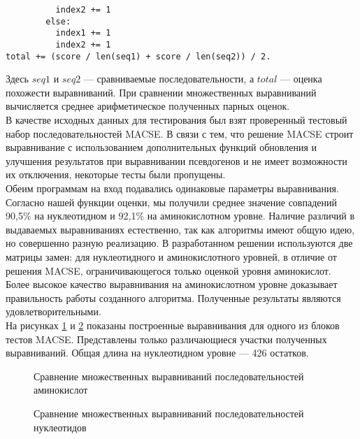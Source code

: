 \begin{algorithm}
	\begin{lstlisting}
          index2 += 1      
        else:
          index1 += 1
          index2 += 1
total += (score / len(seq1) + score / len(seq2)) / 2.
	\end{lstlisting}
\end{algorithm}
Здесь $seq1$ и $seq2$ --- сравниваемые последовательности, а $total$ --- оценка похожести выравниваний. При сравнении множественных выравниваний вычисляется среднее арифметическое полученных парных оценок.\\
\indent В качестве исходных данных для тестирования был взят проверенный тестовый набор последовательностей MACSE. В связи с тем, что решение MACSE строит выравнивание с использованием дополнительных функций обновления и улучшения результатов при выравнивании псевдогенов и не имеет возможности их отключения, некоторые тесты были пропущены. \\
\indent Обеим программам на вход подавались одинаковые параметры выравнивания. Согласно нашей функции оценки, мы получили среднее значение совпадений 90,5\% на нуклеотидном и 92,1\% на аминокислотном уровне. Наличие различий в выдаваемых выравниваниях естественно, так как алгоритмы имеют общую идею, но совершенно разную реализацию. В разработанном решении используются две матрицы замен: для нуклеотидного и аминокислотного уровней, в отличие от решения MACSE, ограничивающегося только оценкой уровня аминокислот. Более высокое качество выравнивания на аминокислотном уровне доказывает правильность работы созданного алгоритма. Полученные результаты являются удовлетворительными.\\
\indent На рисунках \ref{ris:MM_AA} и \ref{ris:MM_NT} показаны построенные выравнивания для одного из блоков тестов MACSE. Представлены только различающиеся участки полученных выравниваний. Общая длина на нуклеотидном уровне --- 426 остатков.

\begin{figure}[H]
	\caption{Сравнение множественных выравниваний последовательностей аминокислот}
	\label{ris:MM_AA}
\end{figure}

\begin{figure}[H]
	\caption{Сравнение множественных выравниваний последовательностей нуклеотидов}
	\label{ris:MM_NT}
\end{figure}

